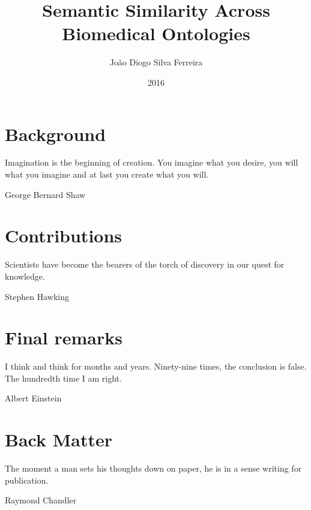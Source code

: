 \documentclass[doctype=phd,lang=en,bibstyle=apa]{ulthesis}
\title      {Semantic Similarity Across\\Biomedical Ontologies}
\author     {João Diogo Silva Ferreira}
\date       {2016}
\begin{document}
\setcounter{page}{-6}

\coverpage




\frontmatter

\startabstract[pt]
\startabstract[en]

\cleardoublepage
{}
{\def\textbf{}\cleardoublepage\listoftables}
\cleardoublepage\listoflistings


\mainmatter

\part{Background}
\epigraph{Imagination is the beginning of creation. You imagine what you desire, you will what you  imagine and at last you create what you will.}{George Bernard Shaw}





\part{Contributions}
\epigraph{Scientists have become the  bearers of the torch of discovery in our quest for knowledge.}{Stephen Hawking}








\part{Final remarks}
\epigraph{I think and think for months and years. Ninety-nine times, the conclusion is false. The hundredth time I am right.}{Albert Einstein}



\part{Back Matter}
\epigraph{The moment a man sets his thoughts down on paper, he is in a sense writing for publication.}{Raymond Chandler}

\appendix



\small
\printbibliography
\end{document}
